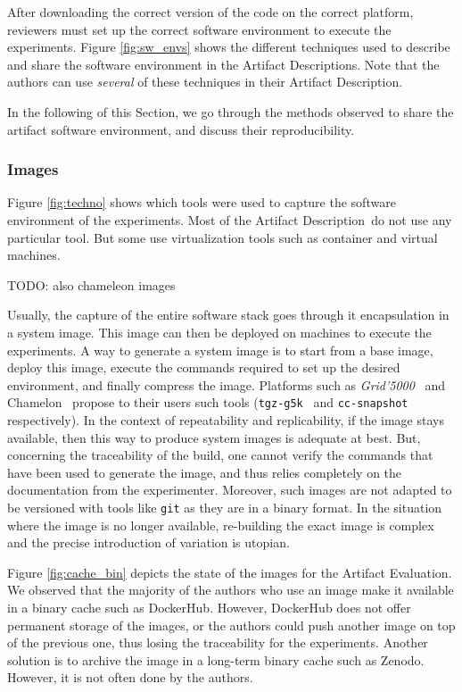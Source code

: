 \documentclass[sigconf,natbib=false]{acmart}
\newcommand{\grid}{\emph{Grid'5000}}
\newcommand{\ad}{Artifact Description}
\newcommand{\aeval}{Artifact Evaluation}
\newcommand{\todo}[1]{{\color{red}TODO: #1}}
\begin{document}
After downloading the correct version of the code on the correct platform, reviewers must set up the correct software environment to execute the experiments.
Figure \ref{fig:sw_envs} shows the different techniques used to describe and share the software environment in the \ad s.
Note that the authors can use \emph{several} of these techniques in their \ad.

In the following of this Section, we go through the methods observed to share the artifact software environment, and discuss their reproducibility.

\subsubsection{Images}

Figure \ref{fig:techno} shows which tools were used to capture the software environment of the experiments.
Most of the \ad\ do not use any particular tool.
But some use virtualization tools such as container and virtual machines.

\todo{also chameleon images}

Usually, the capture of the entire software stack goes through it encapsulation in a system image.
This image can then be deployed on machines to execute the experiments.
A way to generate a system image is to start from a base image, deploy this image, execute the commands required to set up the desired environment, and finally compress the image.
Platforms such as \grid\ \cite{grid5000} and Chamelon\ \cite{chameleon} propose to their users such tools (\texttt{tgz-g5k}\ \cite{tgz-g5k} and \texttt{cc-snapshot}\ \cite{cc-snapshot} respectively).
In the context of repeatability and replicability, if the image stays available, then this way to produce system images is adequate at best.
But, concerning the traceability of the build, one cannot verify the commands that have been used to generate the image, and thus relies completely on the documentation from the experimenter.
Moreover, such images are not adapted to be versioned with tools like \texttt{git} as they are in a binary format.
In the situation where the image is no longer available, re-building the exact image is complex and the precise introduction of variation is utopian.

Figure \ref{fig:cache_bin} depicts the state of the images for the \aeval.
We observed that the majority of the authors who use an image make it available in a binary cache such as DockerHub. 
However, DockerHub does not offer permanent storage of the images, or the authors could push another image on top of the previous one, thus losing the traceability for the experiments.
Another solution is to archive the image in a long-term binary cache such as Zenodo.
However, it is not often done by the authors.
\end{document}
